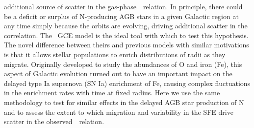 \documentclass[ms.tex]{subfiles}
\begin{document}
additional source of scatter in the gas-phase~\ohno~relation.
In principle, there could be a deficit or surplus of N-producing AGB stars in a
given Galactic region at any time simply because the orbits are evolving,
driving additional scatter in the correlation.
The~\citet{Johnson2021} GCE model is the ideal tool with which to test this
hypothesis.
The novel difference between theirs and previous models with similar
motivations is that it allows stellar populations to enrich distributions of
radii as they migrate.
Originally developed to study the abundances of O and iron (Fe), this aspect of
Galactic evolution turned out to have an important impact on the delayed type
Ia supernova (SN Ia) enrichment of Fe, causing complex fluctuations in the
enrichment rates with time at fixed radius.
Here we use the same methodology to test for similar effects in the delayed AGB
star production of N and to assess the extent to which migration and
variability in the SFE drive scatter in the observed~\ohno~relation.
\end{document}
